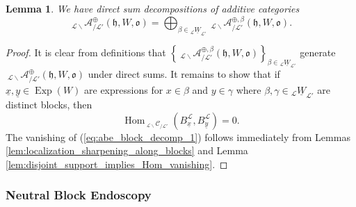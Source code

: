 \documentclass{amsart}
\newcommand{\scrL}{\mathcal{L}}
\DeclareMathOperator{\Hom}{Hom}
\newcommand{\fr}[1]{\mathfrak{#1}}
\newcommand{\Cmon}[2]{\:_{#1 \backslash} \mathcal{C}_{/ #2} }
\newcommand{\Amon}[2]{\:_{#1 \backslash} \mathcal{A}_{/ #2} }
\DeclareMathOperator{\Exp}{Exp}
\newcommand{\uW}[2]{{}_{#1}\underline{W}_{#2}}
\newcommand{\ux}{\underline{x}}
\newcommand{\uy}{\underline{y}}
\newtheorem{lemma}[subsubsection]{Lemma}
\theoremstyle{definition}
\numberwithin{equation}{subsection}
\begin{document}
\begin{lemma}\label{lem:abe_block_decomp}
    We have direct sum decompositions of additive categories
    \[\Amon{\scrL}{\scrL'}^{\oplus} (\fr{h}, W, \fr{o}) = \bigoplus_{\beta \in \uW{\scrL}{\scrL'}} \Amon{\scrL}{\scrL'}^{\oplus, \beta} (\fr{h}, W, \fr{o}).\]
\end{lemma}
\begin{proof}
    It is clear from definitions that $\left\{ \Amon{\scrL}{\scrL'}^{\oplus, \beta} (\fr{h}, W, \fr{o}) \right\}_{\beta \in \uW{\scrL}{\scrL'}}$ generate $\Amon{\scrL}{\scrL'}^{\oplus} (\fr{h}, W, \fr{o})$ under direct sums.
    It remains to show that if $\ux, \uy \in \Exp (W)$ are expressions for $x \in \beta$ and $y \in \gamma$ where $\beta, \gamma \in \uW{\scrL}{\scrL'}$ are distinct blocks, then
    \begin{equation}\label{eq:abe_block_decomp_1}
        \Hom_{\Cmon{\scrL}{\scrL'}} (B_{\ux}^{\scrL}, B_{\uy}^{\scrL}) = 0.
    \end{equation}
    The vanishing of (\ref{eq:abe_block_decomp_1}) follows immediately from Lemmas \ref{lem:localization_sharpening_along_blocks} and Lemma \ref{lem:disjoint_support_implies_Hom_vanishing}.
\end{proof}

\subsubsection{Neutral Block Endoscopy}
\end{document}

